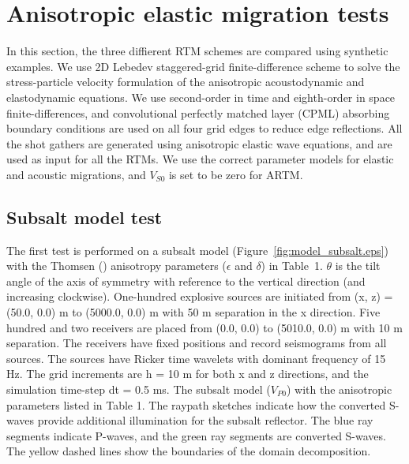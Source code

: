 \documentclass[manuscript,ulem,graphix,revised]{geophysics}
\begin{document}
\section{Anisotropic elastic migration tests}
\indent\indent
In this section, the three diffierent RTM schemes are compared using synthetic examples. We use 2D Lebedev staggered-grid finite-difference scheme \citep{vadim10} to solve the stress-particle velocity formulation of the anisotropic acoustodynamic and elastodynamic equations. We use second-order in time and eighth-order in space finite-differences, and convolutional perfectly matched layer (CPML) absorbing boundary conditions \citep{komatitsch07} are used on all four grid edges 
to reduce edge reflections. All the shot gathers are generated using anisotropic elastic wave equations, and are used as input for all the RTMs. 
We use the correct parameter models for elastic and acoustic migrations, and $V_{S0}$ is set to be zero for ARTM. 

\subsection{Subsalt model test}
\indent\indent
The first test is performed on a subsalt model (Figure~\ref{fig:model_subsalt.eps}) with the Thomsen (\citeyear{thomsen86}) anisotropy parameters ($\epsilon$ and $\delta$) in Table~1. $\theta$ is the tilt angle of the axis of symmetry with reference to the vertical direction (and increasing clockwise).
One-hundred explosive sources are initiated from (x, z) = (50.0, 0.0) m to  (5000.0, 0.0) m with 50 m separation in the x direction. Five hundred and two receivers are placed from (0.0, 0.0) to (5010.0, 0.0) m with 10 m separation. The receivers have fixed positions and record seismograms from all sources. The sources have Ricker time wavelets with dominant frequency of 15 Hz. 
The grid increments are h = 10 m for both x and z directions, and the simulation time-step dt = 0.5 ms. 
{
The subsalt model ($V_{P0}$) with the anisotropic parameters listed in Table 1. The raypath sketches indicate how the converted S-waves provide additional illumination for the subsalt reflector. The blue ray segments indicate P-waves, and the green ray segments are converted S-waves. The yellow dashed lines show the boundaries of the domain decomposition. 
}

\end{document}
